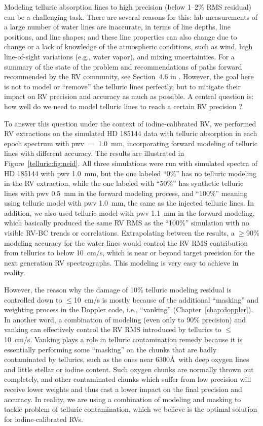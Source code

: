 Modeling telluric absorption lines to high precision (below 1--2\% RMS
residual) can be a challenging task. There are several reasons for
this: lab measurements of a large number of water lines are
inaccurate, in terms of line depths, line positions, and line shapes;
and these line properties can also change due to change or a lack of
knowledge of the atmospheric conditions, such as wind, high
line-of-sight variations (e.g., water vapor), and mixing
uncertainties. For a summary of the state of the problem and
recommendations of paths forward recommended by the RV community, see
Section~4.6 in \cite{eprv2015}. However, the goal here is not to model
or ``remove'' the telluric lines perfectly, but to mitigate their
impact on RV precision and accuracy as much as possible. A central
question is: how well do we need to model telluric lines to reach a
certain RV precision \citep{eprv2015}?

To answer this question under the context of iodine-calibrated RV, we
performed RV extractions on the simulated HD 185144 data with telluric
absorption in each epoch spectrum with pwv $=$ 1.0~mm, incorporating
forward modeling of telluric lines with different accuracy. The
results are illustrated in Figure~\ref{telluric:fig:neid}. All three
simulations were run with simulated spectra of HD 185144 with pwv
1.0~mm, but the one labeled ``0\%'' has no telluric modeling in the RV
extraction, while the one labeled with ``50\%'' has synthetic telluric
lines with pwv 0.5~mm in the forward modeling process, and ``100\%''
meaning using telluric model with pwv 1.0~mm, the same as the injected
telluric lines. In addition, we also used telluric model with pwv
1.1~mm in the forward modeling, which basically produced the same RV
RMS as the ``100\%'' simulation with no visible RV-BC trends or
correlations. Extrapolating between the results, a $\geq$90\% modeling
accuracy for the water lines would control the RV RMS contribution
from tellurics to below 10~cm/s, which is near or beyond target
precision for the next generation RV spectrographs. This modeling is
very easy to achieve in reality. 

However, the reason why the damage of 10\% telluric modeling residual
is controlled down to $\leq$10~cm/s is mostly because of the
additional ``masking'' and weighting process in the Doppler code,
i.e., ``vanking'' (Chapter~\ref{chap:doppler}). In another word, a
combination of modeling (even only to 90\% precision) and vanking can
effectively control the RV RMS introduced by tellurics to
$\leq$10~cm/s. Vanking plays a role in telluric contamination remedy
because it is essentially performing some ``masking'' on the chunks
that are badly contaminated by tellurics, such as the ones near
6300\AA\ with deep oxygen lines and little stellar or iodine
content. Such oxygen chunks are normally thrown out completely, and
other contaminated chunks which suffer from low precision will receive
lower weights and thus cast a lower impact on the final precision and
accuracy. In reality, we are using a combination of modeling and
masking to tackle problem of telluric contamination, which we believe
is the optimal solution for iodine-calibrated RVs.


